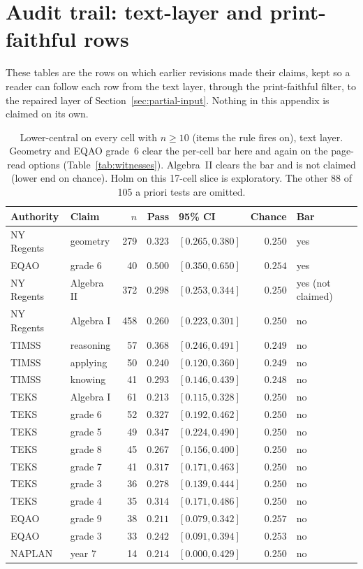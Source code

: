 \section{Audit trail: text-layer and print-faithful rows}
\label{app:trail}

These tables are the rows on which earlier revisions made their claims, kept so a reader can follow each row from the text layer, through the print-faithful filter, to the repaired layer of Section~\ref{sec:partial-input}. Nothing in this appendix is claimed on its own.

\begin{table}[t]
  \caption{Lower-central on every cell with $n\ge 10$ (items the rule fires on), text layer. Geometry and EQAO grade~6 clear the per-cell bar here and again on the page-read options (Table~\ref{tab:witnesses}). Algebra~II clears the bar and is not claimed (lower end on chance). Holm on this 17-cell slice is exploratory. The other 88 of 105 a priori tests are omitted.}
  \label{tab:middle}
  \centering
  \scriptsize
  \begin{tabular}{l l r r l r l}
    \toprule
    Authority & Claim & $n$ & Pass & 95\% CI & Chance & Bar \\
    \midrule
    NY Regents & geometry & 279 & $0.323$ & $[0.265, 0.380]$ & $0.250$ & yes \\
    EQAO & grade 6 & 40 & $0.500$ & $[0.350, 0.650]$ & $0.254$ & yes \\
    NY Regents & Algebra II & 372 & $0.298$ & $[0.253, 0.344]$ & $0.250$ & yes (not claimed) \\
    NY Regents & Algebra I & 458 & $0.260$ & $[0.223, 0.301]$ & $0.250$ & no \\
    TIMSS & reasoning & 57 & $0.368$ & $[0.246, 0.491]$ & $0.249$ & no \\
    TIMSS & applying & 50 & $0.240$ & $[0.120, 0.360]$ & $0.249$ & no \\
    TIMSS & knowing & 41 & $0.293$ & $[0.146, 0.439]$ & $0.248$ & no \\
    TEKS & Algebra I & 61 & $0.213$ & $[0.115, 0.328]$ & $0.250$ & no \\
    TEKS & grade 6 & 52 & $0.327$ & $[0.192, 0.462]$ & $0.250$ & no \\
    TEKS & grade 5 & 49 & $0.347$ & $[0.224, 0.490]$ & $0.250$ & no \\
    TEKS & grade 8 & 45 & $0.267$ & $[0.156, 0.400]$ & $0.250$ & no \\
    TEKS & grade 7 & 41 & $0.317$ & $[0.171, 0.463]$ & $0.250$ & no \\
    TEKS & grade 3 & 36 & $0.278$ & $[0.139, 0.444]$ & $0.250$ & no \\
    TEKS & grade 4 & 35 & $0.314$ & $[0.171, 0.486]$ & $0.250$ & no \\
    EQAO & grade 9 & 38 & $0.211$ & $[0.079, 0.342]$ & $0.257$ & no \\
    EQAO & grade 3 & 33 & $0.242$ & $[0.091, 0.394]$ & $0.253$ & no \\
    NAPLAN & year 7 & 14 & $0.214$ & $[0.000, 0.429]$ & $0.250$ & no \\
    \bottomrule
  \end{tabular}
\end{table}

